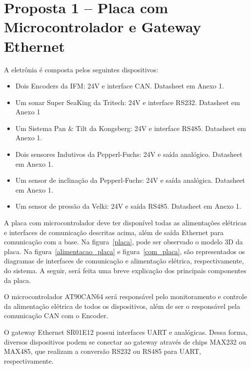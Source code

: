 \section{Proposta 1 – Placa com Microcontrolador e Gateway Ethernet}

A eletrônia é composta pelos seguintes dispositivos:
\begin{itemize}
  \item Dois Encoders da IFM: 24V e interface CAN. Datasheet em Anexo 1.
  \item Um sonar Super SeaKing da Tritech: 24V e interface RS232. Datasheet em
  Anexo 1
  \item Um Sistema Pan \& Tilt da Kongsberg: 24V e interface RS485. Datasheet em
  Anexo 1.
  \item Dois sensores Indutivos da Pepperl-Fuchs: 24V e saída analógico.
  Datasheet em Anexo 1.
  \item Um sensor de inclinação da Pepperl-Fuchs: 24V e saída analógica.
  Datasheet em Anexo 1.
  \item Um sensor de pressão da Velki: 24V e saída RS485. Datasheet em Anexo 1.
\end{itemize}	

A placa com microcontrolador deve ter disponível todas as alimentações elétricas
e interfaces de comunicação descritas acima, além de saída Ethernet para
comunicação com a base. Na figura~\ref{placa}, pode ser observado o modelo 3D da
placa. Na figura~\ref{alimentacao_placa} e figura~\ref{com_placa}, são
representados os diagramas de interfaces de comunicação e alimentação elétrica, respectivamente, do sistema. A seguir, será feita uma breve explicação dos principais componentes da placa.

O microcontrolador AT90CAN64 será responsável pelo monitoramento e controle da alimentação elétrica de todos os dispositivos, além de ser o responsável pela comunicação CAN com o Encoder. 

O gateway Ethernet SR01E12 possui interfaces UART e analógicas. Dessa forma, diversos dispositivos podem se conectar ao gateway através de chips MAX232 ou MAX485, que realizam a conversão RS232 ou RS485 para UART, respectivamente.
  
